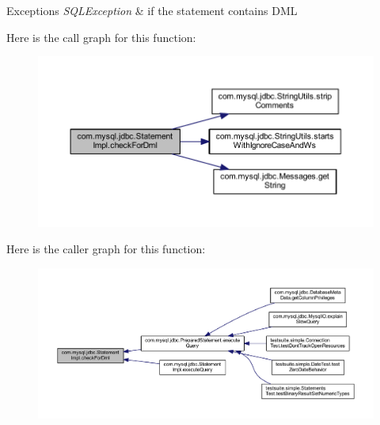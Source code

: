 \begin{DoxyExceptions}{Exceptions}
{\em S\+Q\+L\+Exception} & if the statement contains D\+ML \\
\hline
\end{DoxyExceptions}
Here is the call graph for this function\+:
\nopagebreak
\begin{figure}[H]
\begin{center}
\leavevmode
\includegraphics[width=350pt]{classcom_1_1mysql_1_1jdbc_1_1_statement_impl_a9f707faf90e18c724869f1745933c1df_cgraph}
\end{center}
\end{figure}
Here is the caller graph for this function\+:
\nopagebreak
\begin{figure}[H]
\begin{center}
\leavevmode
\includegraphics[width=350pt]{classcom_1_1mysql_1_1jdbc_1_1_statement_impl_a9f707faf90e18c724869f1745933c1df_icgraph}
\end{center}
\end{figure}
\mbox{\label{classcom_1_1mysql_1_1jdbc_1_1_statement_impl_a29ea5f4b5f00602d6b7845623c616a7d}} 
